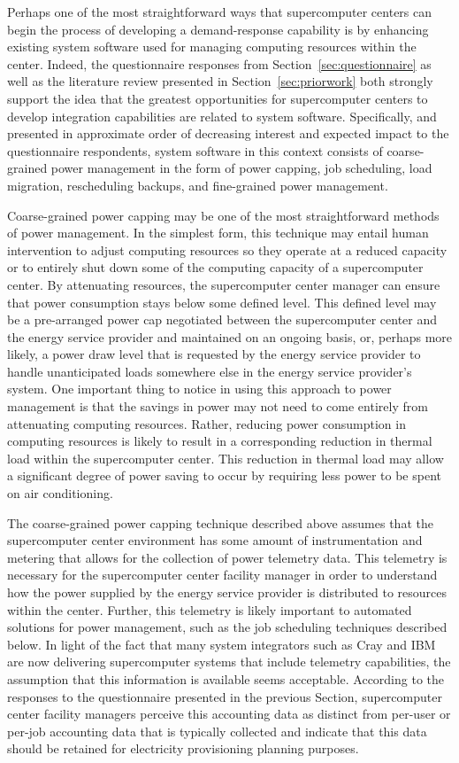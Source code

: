 Perhaps one of the most straightforward ways that supercomputer
centers can begin the process of developing a demand-response
capability is by enhancing existing system software used for managing
computing resources within the center.  Indeed, the questionnaire
responses from Section~\ref{sec:questionnaire} as well as the literature
review presented in Section~\ref{sec:priorwork} both strongly support the
idea that the greatest opportunities for supercomputer centers to
develop integration capabilities are related to system software.
Specifically, and presented in approximate order of decreasing
interest and expected impact to the questionnaire respondents, system
software in this context consists of coarse-grained power management
in the form of power capping, job scheduling, load migration,
rescheduling backups, and fine-grained power management.

Coarse-grained power capping may be one of the most straightforward
methods of power management.  In the simplest form, this technique may
entail human intervention to adjust computing resources so they
operate at a reduced capacity or to entirely shut down some of the
computing capacity of a supercomputer center.  By attenuating
resources, the supercomputer center manager can ensure that power
consumption stays below some defined level.  This defined level may be
a pre-arranged power cap negotiated between the supercomputer center
and the energy service provider and maintained on an ongoing basis,
or, perhaps more likely, a power draw level that is requested by the
energy service provider to handle unanticipated loads somewhere else
in the energy service provider's system.  One important thing to
notice in using this approach to power management is that the savings
in power may not need to come entirely from attenuating computing
resources.  Rather, reducing power consumption in computing resources
is likely to result in a corresponding reduction in thermal load
within the supercomputer center.  This reduction in thermal load
may allow a significant degree of power saving to occur by requiring
less power to be spent on air conditioning.

The coarse-grained power capping technique described above assumes
that the supercomputer center environment has some amount of
instrumentation and metering that allows for the collection of power
telemetry data.  This telemetry is necessary for the supercomputer
center facility manager in order to understand how the power supplied
by the energy service provider is distributed to resources within the
center.  Further, this telemetry is likely important to automated
solutions for power management, such as the job scheduling techniques
described below.  In light of the fact that many system integrators
such as Cray and IBM are now delivering supercomputer systems that
include telemetry capabilities, the assumption that this information
is available seems acceptable.  According to the responses to the
questionnaire presented in the previous Section, supercomputer center
facility managers perceive this accounting data as distinct from
per-user or per-job accounting data that is typically collected and
indicate that this data should be retained for electricity
provisioning planning purposes.

